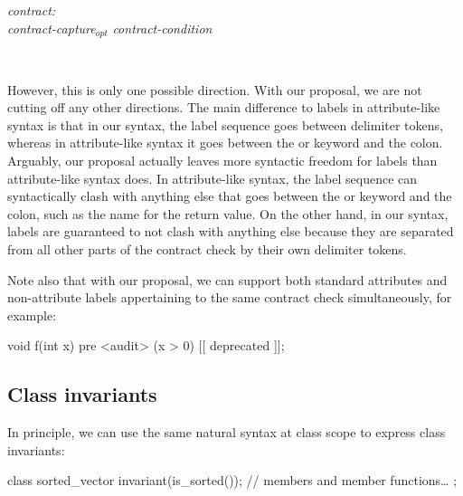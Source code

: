 \begin{adjustwidth}{0.5cm}{0.5cm}

\emph{contract:} \\
\phantom{~~~} \emph{contract-capture}$_{opt}$ \emph{contract-condition}

 \\
\phantom{~~~}

\end{adjustwidth}

However, this is only one possible direction. With our proposal, we are not cutting off any other directions. The main difference to labels in attribute-like syntax is that in our syntax, the label sequence goes between delimiter tokens, whereas in attribute-like syntax it goes between the  or  keyword and the colon. Arguably, our proposal actually leaves more syntactic freedom for labels than attribute-like syntax does. In attribute-like syntax, the label sequence can syntactically clash with anything else that goes between the  or  keyword and the colon, such as the name for the return value. On the other hand, in our syntax, labels are guaranteed to not clash with anything else because they are separated from all other parts of the contract check by their own delimiter tokens.

Note also that with our proposal, we can support both standard attributes and non-attribute labels appertaining to the same contract check simultaneously, for example:

\begin{codeblock}
void f(int x)
  pre <audit> (x > 0) [[ deprecated ]];
\end{codeblock}


\subsection{Class invariants}
\label{subsec:invariants}

In principle, we can use the same natural syntax at class scope to express class invariants:

\begin{codeblock}
class sorted_vector {
  invariant(is_sorted());
  // members and member functions…
};
\end{codeblock}

